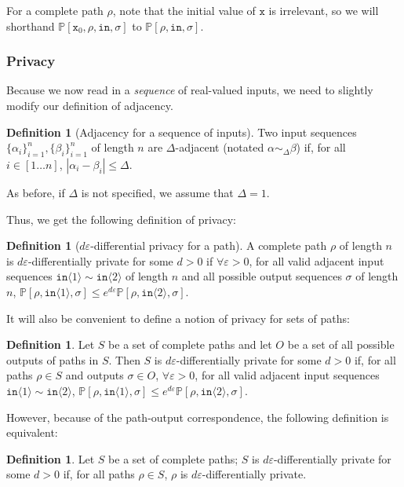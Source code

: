 \documentclass[12pt]{article}
\newcommand{\PP}{\mathbb{P}}
\newcommand{\brangle}[1]{\langle #1 \rangle}
\theoremstyle{definition}
\newtheorem{defn}[thm]{Definition}
\begin{document}
For a complete path $\rho$, note that the initial value of $\texttt{x}$ is irrelevant, so we will shorthand $\PP[\texttt{x}_0, \rho, \texttt{in}, \sigma]$ to $\PP[\rho, \texttt{in}, \sigma]$.


\subsubsection{Privacy}

Because we now read in a \textit{sequence} of real-valued inputs, we need to slightly modify our definition of adjacency.

\begin{defn}[Adjacency for a sequence of inputs]
    Two input sequences $\{\alpha_i\}_{i=1}^n, \{\beta_i\}_{i=1}^n$ of length $n$ are $\Delta$-adjacent (notated $\alpha \sim_{\Delta}\beta$) if, for all $i\in [1\ldots n]$, $|\alpha_i-\beta_i|\leq \Delta$. 

    As before, if $\Delta$ is not specified, we assume that $\Delta = 1$. 
\end{defn}

Thus, we get the following definition of privacy:

\begin{defn}[$d\varepsilon$-differential privacy for a path]
    A complete path $\rho$ of length $n$ is $d\varepsilon$-differentially private for some $d>0$ if $\forall \varepsilon>0$, for all valid adjacent input sequences $\texttt{in}\brangle{1}\sim \texttt{in}\brangle{2}$ of length $n$ and all possible output sequences $\sigma$ of length $n$, $\PP[\rho, \texttt{in}\brangle{1}, \sigma]\leq e^{d\varepsilon}\PP[\rho, \texttt{in}\brangle{2}, \sigma]$.
\end{defn}

It will also be convenient to define a notion of privacy for sets of paths:
\begin{defn}
    Let $S$ be a set of complete paths and let $O$ be a set of all possible outputs of paths in $S$. 
    Then $S$ is $d\varepsilon$-differentially private for some $d>0$ if, for all paths $\rho\in S$ and outputs $\sigma\in O$, $\forall \varepsilon>0$, for all valid adjacent input sequences $\texttt{in}\brangle{1}\sim \texttt{in}\brangle{2}$, $\PP[\rho, \texttt{in}\brangle{1}, \sigma]\leq e^{d\varepsilon}\PP[\rho, \texttt{in}\brangle{2}, \sigma]$.
\end{defn}

However, because of the path-output correspondence, the following definition is equivalent:
\begin{defn}
    Let $S$ be a set of complete paths; $S$ is $d\varepsilon$-differentially private for some $d>0$ if, for all paths $\rho\in S$, $\rho$ is $d\varepsilon$-differentially private.
\end{defn}
\end{document}
